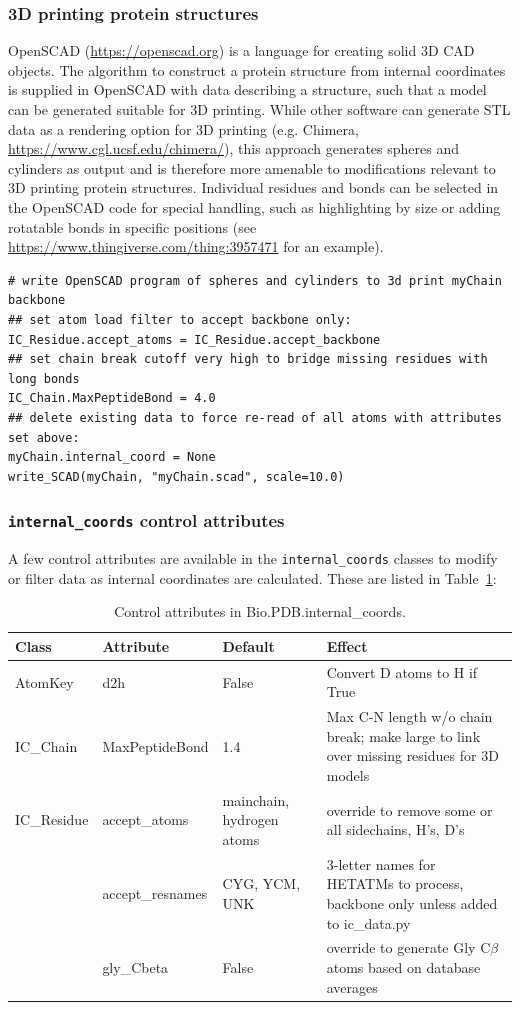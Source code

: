 \subsubsection{3D printing protein structures}

OpenSCAD (\url{https://openscad.org}) is a language for creating solid 3D CAD objects.
The algorithm to construct a protein structure from internal coordinates is supplied
in OpenSCAD with data describing a structure, such that a model can be generated suitable
for 3D printing.  While other software can generate STL data as a rendering option for
3D printing (e.g. Chimera, \url{https://www.cgl.ucsf.edu/chimera/}), this approach generates
spheres and cylinders as output and is therefore more amenable to modifications relevant to
3D printing protein structures.  Individual residues and bonds can be selected
in the OpenSCAD code for special handling, such as highlighting by size or adding
rotatable bonds in specific positions (see \url{https://www.thingiverse.com/thing:3957471}
for an example).

\begin{verbatim}
# write OpenSCAD program of spheres and cylinders to 3d print myChain backbone
## set atom load filter to accept backbone only:
IC_Residue.accept_atoms = IC_Residue.accept_backbone
## set chain break cutoff very high to bridge missing residues with long bonds
IC_Chain.MaxPeptideBond = 4.0
## delete existing data to force re-read of all atoms with attributes set above:
myChain.internal_coord = None
write_SCAD(myChain, "myChain.scad", scale=10.0)
\end{verbatim}

\subsubsection{\texttt{internal\_coords} control attributes}

A few control attributes are available in the \texttt{internal\_coords} classes to modify or
filter data as internal coordinates are calculated.  These are listed in Table~\ref{table:ic-attribs}:

\begin{table}
	\begin{tabular}{|l|l|l|l|}
		\hline
		Class&Attribute&Default&Effect\\
		\hline
		\hline
		AtomKey& d2h&False&Convert D atoms to H if True\\
		\hline
		IC\_Chain&MaxPeptideBond&1.4&Max C-N length w/o chain break; make large to link over missing residues for 3D models \\
		\hline
		IC\_Residue&accept\_atoms&mainchain, hydrogen atoms&override to remove some or all sidechains, H's, D's\\
		\hline
		&accept\_resnames&CYG, YCM, UNK&3-letter names for HETATMs to process, backbone only unless added to ic\_data.py \\
		\hline
		&gly\_Cbeta&False&override to generate Gly C$\beta$ atoms based on database averages \\
		\hline
	\end{tabular}
	\caption{Control attributes in Bio.PDB.internal\_coords.}
	\label{table:ic-attribs}
\end{table}

